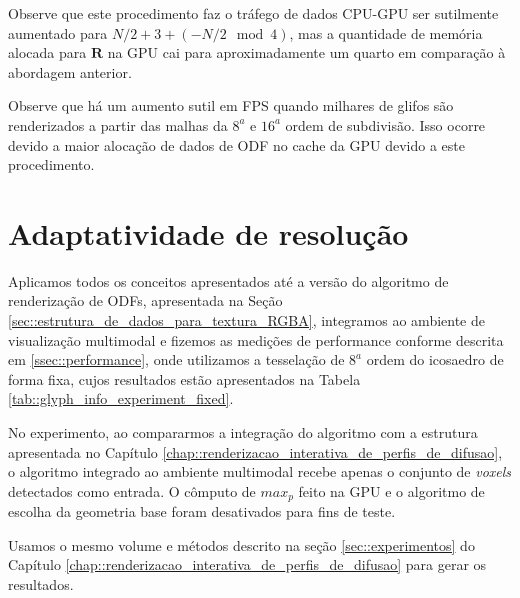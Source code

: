\documentclass[
    12pt,                %
    oneside,            %
    a4paper,            %
    english,            %
    french,                %
    spanish,            %
    brazil                %
    ]{abntex2}
\begin{document}
Observe que este procedimento faz o tráfego de dados CPU-GPU ser sutilmente aumentado para $N/2 + 3 + (-N/2 \mod{4})$, mas a quantidade de memória alocada para $\mathbf{R}$ na GPU cai para aproximadamente um quarto em comparação à abordagem anterior.

Observe que há um aumento sutil em FPS quando milhares de glifos são renderizados a partir das malhas da $8^a$ e $16^a$ ordem de subdivisão. Isso ocorre devido a maior alocação de dados de ODF no cache da GPU devido a este procedimento.


\section{Adaptatividade de resolução}
\label{sec::adaptatividade_de_resolucao}

Aplicamos todos os conceitos apresentados até a versão do algoritmo de renderização de ODFs, apresentada na Seção \ref{sec::estrutura_de_dados_para_textura_RGBA}, integramos ao ambiente de visualização multimodal e fizemos as medições de performance conforme descrita em \ref{ssec::performance}, onde utilizamos a tesselação de $8^a$ ordem do icosaedro de forma fixa, cujos resultados estão apresentados na Tabela \ref{tab::glyph_info_experiment_fixed}.

No experimento, ao compararmos a integração do algoritmo com a estrutura apresentada no Capítulo \ref{chap::renderizacao_interativa_de_perfis_de_difusao}, o algoritmo integrado ao ambiente multimodal recebe apenas o conjunto de \textit{voxels} detectados como entrada. O cômputo de $max_p$ feito na GPU e o algoritmo de escolha da geometria base foram desativados para fins de teste.

Usamos o mesmo volume e métodos descrito na seção \ref{sec::experimentos} do Capítulo \ref{chap::renderizacao_interativa_de_perfis_de_difusao} para gerar os resultados.
\end{document}
